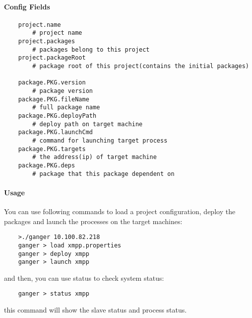 \documentclass[]{article}
\newcommand{\program}[1]{\textsf{#1}}
\begin{document}
\paragraph{Config Fields}

\begin{Verbatim}
    project.name
    	# project name
    project.packages
    	# packages belong to this project
    project.packageRoot
    	# package root of this project(contains the initial packages)
    
    package.PKG.version
    	# package version
    package.PKG.fileName
    	# full package name
    package.PKG.deployPath
    	# deploy path on target machine
    package.PKG.launchCmd
    	# command for launching target process
    package.PKG.targets
    	# the address(ip) of target machine
    package.PKG.deps
    	# package that this package dependent on
\end{Verbatim}

\paragraph{Usage}

You can use following commands to load a project configuration, deploy the packages and launch the processes on the target machines:
\begin{Verbatim}
    >./ganger 10.100.82.218
    ganger > load xmpp.properties
    ganger > deploy xmpp
    ganger > launch xmpp
\end{Verbatim}
and then, you can use \program{status} to check system status: 

\begin{Verbatim}
    ganger > status xmpp
\end{Verbatim}
this command will show the slave status and process status.
\end{document}
